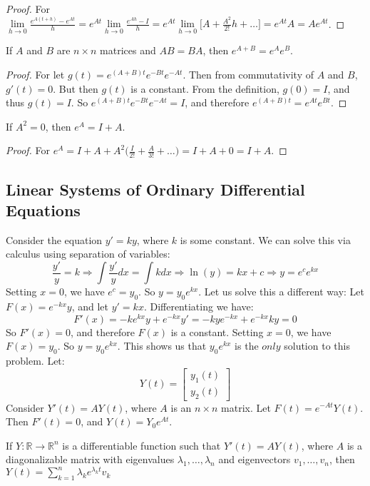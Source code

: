     \begin{proof}
    For $\underset{h\rightarrow 0}\lim \frac{e^{A(t+h)}-e^{At}}{h} = e^{At}\underset{h\rightarrow 0}\lim \frac{e^{Ah}-I}{h} = e^{At}\underset{h\rightarrow 0}\lim\big[A+\frac{A^2}{2!}h+\hdots\big] = e^{At}A = Ae^{At}$.
    \end{proof}
    \begin{theorem}
    If $A$ and $B$ are $n\times n$ matrices and $AB=BA$, then $e^{A+B} = e^{A}e^{B}$.
    \end{theorem}
    \begin{proof}
    For let $g(t) = e^{(A+B)t}e^{-Bt}e^{-At}$. Then from commutativity of $A$ and $B$, $g'(t) = 0$. But then $g(t)$ is a constant. From the definition, $g(0) = I$, and thus $g(t) = I$. So $e^{(A+B)t}e^{-Bt}e^{-At} = I$, and therefore $e^{(A+B)t} = e^{At}e^{Bt}$.
    \end{proof}
    \begin{theorem}
    If $A^{2} = 0$, then $e^{A} = I+A$.
    \end{theorem}
    \begin{proof}
    For $e^{A} = I+A+A^{2}\big(\frac{I}{2!}+\frac{A}{3!}+\hdots\big) = I+A+0 = I+A$.
    \end{proof}
    \subsection{Linear Systems of Ordinary Differential Equations}
    Consider the equation $y' = ky$, where $k$ is some constant. We can solve this via calculus using separation of variables:
    \begin{equation*}
        \frac{y'}{y} = k\Rightarrow \int \frac{y'}{y}dx = \int kdx \Rightarrow \ln(y) = kx+c \Rightarrow y = e^c e^{kx}    
    \end{equation*}
    Setting $x=0$, we have $e^c = y_0$. So $y = y_0e^{kx}$. Let us solve this a different way: Let $F(x) = e^{-kx}y$, and let $y'=kx$. Differentiating we have:
    \begin{equation*}
        F'(x)=-ke^{kx}y+e^{-kx}y'=-kye^{-kx}+e^{-kx}ky=0    
    \end{equation*}
    So $F'(x) = 0$, and therefore $F(x)$ is a constant. Setting $x=0$, we have $F(x) = y_0$. So $y = y_0e^{kx}$. This shows us that $y_0e^{kx}$ is the $only$ solution to this problem. Let:
    \begin{equation*}
        Y(t) = \begin{bmatrix} y_1(t) \\ y_2(t)\end{bmatrix}    
    \end{equation*}
    Consider $Y'(t) = AY(t)$, where $A$ is an $n\times n$ matrix. Let $F(t) = e^{-At}Y(t)$. Then $F'(t) = 0$, and $Y(t) = Y_0 e^{At}$.
    \begin{theorem}
    If $Y:\mathbb{R}\rightarrow \mathbb{R}^n$ is a differentiable function such that $Y'(t) = AY(t)$, where $A$ is a diagonalizable matrix with eigenvalues $\lambda_1,\hdots, \lambda_n$ and eigenvectors $v_1,\hdots, v_n$, then $Y(t) = \sum_{k=1}^{n} \lambda_k e^{\lambda_k t}v_k$
    \end{theorem}
